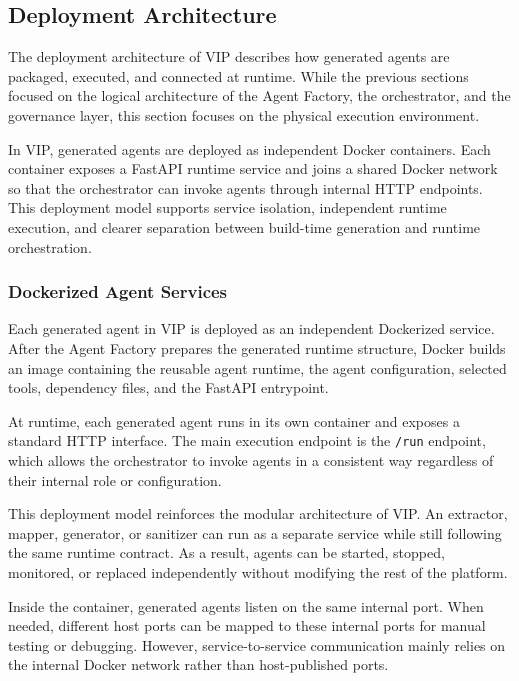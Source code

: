 \subsection{Deployment Architecture}

The deployment architecture of VIP describes how generated agents are packaged, executed, and connected at runtime. While the previous sections focused on the logical architecture of the Agent Factory, the orchestrator, and the governance layer, this section focuses on the physical execution environment.

In VIP, generated agents are deployed as independent Docker containers. Each container exposes a FastAPI runtime service and joins a shared Docker network so that the orchestrator can invoke agents through internal HTTP endpoints. This deployment model supports service isolation, independent runtime execution, and clearer separation between build-time generation and runtime orchestration.

\subsubsection{Dockerized Agent Services}

Each generated agent in VIP is deployed as an independent Dockerized service. After the Agent Factory prepares the generated runtime structure, Docker builds an image containing the reusable agent runtime, the agent configuration, selected tools, dependency files, and the FastAPI entrypoint.

At runtime, each generated agent runs in its own container and exposes a standard HTTP interface. The main execution endpoint is the \texttt{/run} endpoint, which allows the orchestrator to invoke agents in a consistent way regardless of their internal role or configuration.

This deployment model reinforces the modular architecture of VIP. An extractor, mapper, generator, or sanitizer can run as a separate service while still following the same runtime contract. As a result, agents can be started, stopped, monitored, or replaced independently without modifying the rest of the platform.

Inside the container, generated agents listen on the same internal port. When needed, different host ports can be mapped to these internal ports for manual testing or debugging. However, service-to-service communication mainly relies on the internal Docker network rather than host-published ports.

